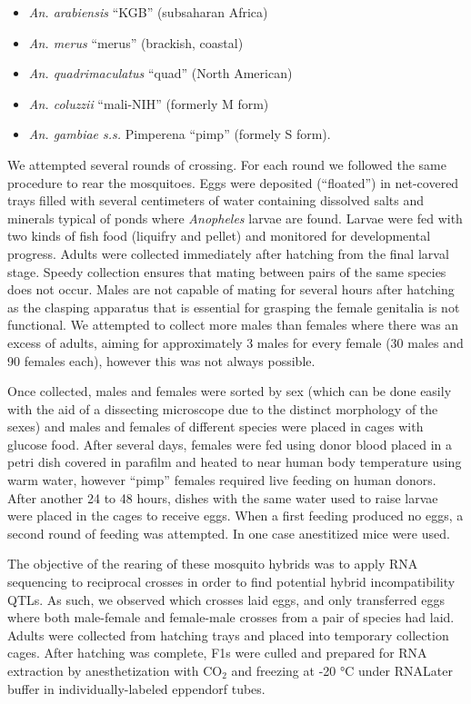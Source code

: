 \documentclass{article}
\begin{document}
\begin{itemize}
\item \emph{An. arabiensis} ``KGB'' (subsaharan Africa)
\item \emph{An. merus} ``merus'' (brackish, coastal)
\item \emph{An. quadrimaculatus} ``quad'' (North American)
\item \emph{An. coluzzii} ``mali-NIH'' (formerly M form)
\item \emph{An. gambiae s.s.} Pimperena ``pimp'' (formely S form).
\end{itemize}

We attempted several rounds of crossing. For each round we followed the same procedure to rear the mosquitoes. Eggs were deposited (``floated'') in net-covered trays filled with several centimeters of water containing dissolved salts and minerals typical of ponds where \emph{Anopheles} larvae are found. Larvae were fed with two kinds of fish food (liquifry and pellet) and monitored for developmental progress. Adults were collected immediately after hatching from the final larval stage. Speedy collection ensures that mating between pairs of the same species does not occur. Males are not capable of mating for several hours after hatching as the clasping apparatus that is essential for grasping the female genitalia is not functional. We attempted to collect more males than females where there was an excess of adults, aiming for approximately 3 males for every female (30 males and 90 females each), however this was not always possible.

Once collected, males and females were sorted by sex (which can be done easily with the aid of a dissecting microscope due to the distinct morphology of the sexes) and males and females of different species were placed in cages with glucose food. After several days, females were fed using donor blood placed in a petri dish covered in parafilm and heated to near human body temperature using warm water, however ``pimp'' females required live feeding on human donors. After another 24 to 48 hours, dishes with the same water used to raise larvae were placed in the cages to receive eggs. When a first feeding produced no eggs, a second round of feeding was attempted. In one case anestitized mice were used.

The objective of the rearing of these mosquito hybrids was to apply RNA sequencing to reciprocal crosses in order to find potential hybrid incompatibility QTLs. As such, we observed which crosses laid eggs, and only transferred eggs where both male-female and female-male crosses from a pair of species had laid. Adults were collected from hatching trays and placed into temporary collection cages. After hatching was complete, F1s were culled and prepared for RNA extraction by anesthetization with CO$_{2}$ and freezing at -20 °C under RNALater buffer in individually-labeled eppendorf tubes.
\end{document}
